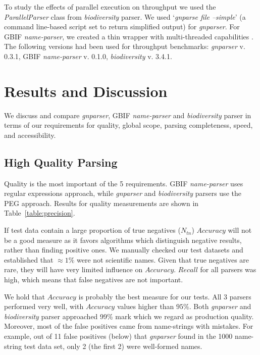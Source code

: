 \documentclass{bmcart}
\begin{document}
To study the effects of parallel execution on throughput we used the \textit{ParallelParser} class from \textit{biodiversity} parser. We used `\textit{gnparse file --simple}' (a command line-based script set to return simplified output) for \textit{gnparser}. For GBIF \textit{name-parser}, we created a thin wrapper with multi-threaded capabilities \cite{gbifparser}. The following versions had been used for throughput benchmarks: \textit{gnparser} v. 0.3.1, GBIF \textit{name-parser} v.  0.1.0, \textit{biodiversity} v. 3.4.1.


\section*{Results and Discussion}\label{sec:discussion}

We discuss and compare \textit{gnparser}, GBIF \textit{name-parser} and \textit{biodiversity} parser in terms of our requirements for quality, global scope, parsing completeness, speed, and accessibility.


\subsection*{High Quality Parsing}

Quality is the most important of the 5 requirements. GBIF \textit{name-parser} uses regular expressions approach, while \textit{gnparser} and \textit{biodiversity} parsers use the PEG approach. Results for quality measurements are shown in Table~\ref{table:precision}.

If test data contain a large proportion of true negatives ($N_{tn}$) $Accuracy$ will not be a good measure as it favors algorithms which distinguish negative results, rather than finding positive ones. We manually checked our test datasets and established that $\approx1\%$ were not scientific names. Given that true negatives are rare, they will have very limited influence on $Accuracy$. $Recall$ for all parsers was high, which means that false negatives are not important.

We hold that $Accuracy$ is probably the best measure for our tests. All 3 parsers performed very well, with $Accuracy$ values higher than $95\%$. Both \textit{gnparser} and \textit{biodiversity} parser approached 99\% mark which we regard as production quality. Moreover, most of the false positives came from name-strings with mistakes. For example, out of 11 false positives (below) that \textit{gnparser} found in the 1000 name-string test data set, only 2 (the first 2) were well-formed names.
\end{document}
